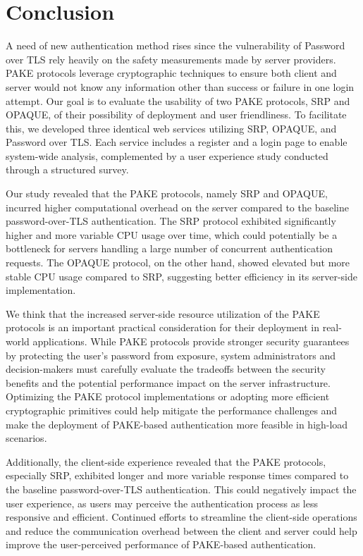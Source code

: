 \section{Conclusion}
\label{sec:conclusion}
A need of new authentication method rises since the vulnerability of Password over TLS rely heavily on the safety measurements made by server providers.
PAKE protocols leverage cryptographic techniques to ensure both client and server would not know any information other than success or failure in one login attempt.
Our goal is to evaluate the usability of two PAKE protocols, SRP and OPAQUE, of their possibility of deployment and user friendliness. 
To facilitate this, we developed three identical web services utilizing SRP, OPAQUE, and Password over TLS.
Each service includes a register and a login page to enable system-wide analysis, complemented by a user experience study conducted through a structured survey.

Our study revealed that the PAKE protocols, namely SRP and OPAQUE, incurred higher computational overhead on the server compared to the baseline password-over-TLS authentication. The SRP protocol exhibited significantly higher and more variable CPU usage over time, which could potentially be a bottleneck for servers handling a large number of concurrent authentication requests. The OPAQUE protocol, on the other hand, showed elevated but more stable CPU usage compared to SRP, suggesting better efficiency in its server-side implementation.

We think that the increased server-side resource utilization of the PAKE protocols is an important practical consideration for their deployment in real-world applications. While PAKE protocols provide stronger security guarantees by protecting the user's password from exposure, system administrators and decision-makers must carefully evaluate the tradeoffs between the security benefits and the potential performance impact on the server infrastructure. Optimizing the PAKE protocol implementations or adopting more efficient cryptographic primitives could help mitigate the performance challenges and make the deployment of PAKE-based authentication more feasible in high-load scenarios.

Additionally, the client-side experience revealed that the PAKE protocols, especially SRP, exhibited longer and more variable response times compared to the baseline password-over-TLS authentication. This could negatively impact the user experience, as users may perceive the authentication process as less responsive and efficient. Continued efforts to streamline the client-side operations and reduce the communication overhead between the client and server could help improve the user-perceived performance of PAKE-based authentication.

